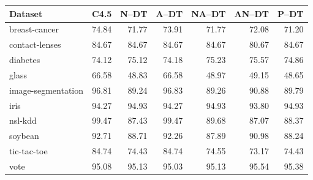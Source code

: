 \begin{tabular}{lrrrrrr}
\toprule
Dataset & C4.5 & N--DT & A--DT & NA--DT & AN--DT & P--DT \\
\midrule
breast-cancer & 74.84 & 71.77 & 73.91 & 71.77 & 72.08 & 71.20 \\
contact-lenses & 84.67 & 84.67 & 84.67 & 84.67 & 80.67 & 84.67 \\
diabetes & 74.12 & 75.12 & 74.18 & 75.23 & 75.57 & 74.86 \\
glass & 66.58 & 48.83 & 66.58 & 48.97 & 49.15 & 48.65 \\
image-segmentation & 96.81 & 89.24 & 96.83 & 89.26 & 90.88 & 89.79 \\
iris & 94.27 & 94.93 & 94.27 & 94.93 & 93.80 & 94.93 \\
nsl-kdd & 99.47 & 87.43 & 99.47 & 89.68 & 87.07 & 88.37 \\
soybean & 92.71 & 88.71 & 92.26 & 87.89 & 90.98 & 88.24 \\
tic-tac-toe & 84.74 & 74.43 & 84.74 & 74.55 & 73.17 & 74.43 \\
vote & 95.08 & 95.13 & 95.03 & 95.13 & 95.54 & 95.38 \\
\bottomrule
\end{tabular}
